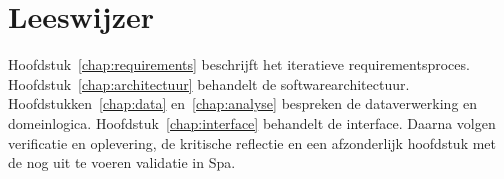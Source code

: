 \section{Leeswijzer}
Hoofdstuk~\ref{chap:requirements} beschrijft het iteratieve requirementsproces. Hoofdstuk~\ref{chap:architectuur} behandelt de softwarearchitectuur. Hoofdstukken~\ref{chap:data} en~\ref{chap:analyse} bespreken de dataverwerking en domeinlogica. Hoofdstuk~\ref{chap:interface} behandelt de interface. Daarna volgen verificatie en oplevering, de kritische reflectie en een afzonderlijk hoofdstuk met de nog uit te voeren validatie in Spa.

